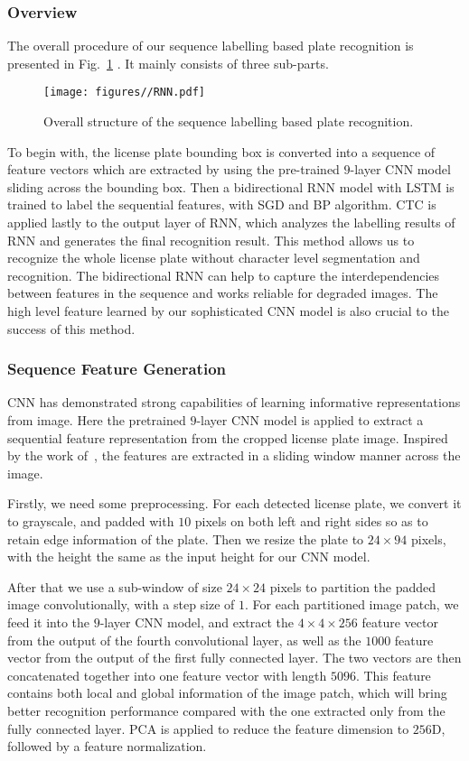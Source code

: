 \documentclass[twocolumn]{svjour3}
\begin{document}
\subsubsection{Overview}
The overall procedure of our sequence labelling based plate recognition is presented in Fig.~\ref{Fig:3} . It mainly consists of three sub-parts.

\begin{figure}[tb]
\centering
\texttt{[image: figures//RNN.pdf]}
\caption{Overall structure of the sequence labelling based plate recognition.}
\label{Fig:3}
\end{figure}To begin with, the license plate bounding box is converted into a sequence of feature vectors which are extracted by using the pre-trained $9$-layer CNN model sliding across the bounding box.
Then a bidirectional RNN model with LSTM is trained to label the sequential features, with SGD and BP algorithm. CTC is applied lastly to the output layer of RNN, which analyzes the labelling results of RNN and generates the final recognition result. This method allows us to recognize the whole license plate without character level segmentation and recognition. The bidirectional RNN can help to capture the interdependencies between features in the sequence and works reliable for degraded images. The high level feature learned by our sophisticated CNN model is also crucial to the success of this method.

\subsubsection{Sequence Feature Generation}
CNN has demonstrated strong capabilities of learning informative representations from image. Here the pretrained $9$-layer CNN model is applied to extract a sequential feature representation from the cropped license plate image. Inspired by the work of~\cite{Su2014ACCV,He2015Reading}, the features are extracted in a sliding window manner across the image.

Firstly, we need some preprocessing. For each detected license plate, we convert it to grayscale, and padded with $10$ pixels on both left and right sides so as to retain edge information of the plate. Then we resize the plate to $24 \times 94$ pixels, with the height the same as the input height for our CNN model. %

After that we use a sub-window of size $24 \times 24$ pixels to partition the padded image convolutionally, with a step size of $1$.  %
For each partitioned image patch, we feed it into the $9$-layer CNN model,  and extract the $4 \times 4 \times 256$ feature vector from the output of the fourth convolutional layer, as well as the $1000$ feature vector from the output of the first fully connected layer. The two vectors are then concatenated together into one feature vector with length $5096$.  This feature contains both local and global information of the image patch, which will bring better recognition performance compared with the one extracted only from the fully connected layer. PCA is applied to reduce the feature dimension to $256$D, followed by a feature normalization.
\end{document}
